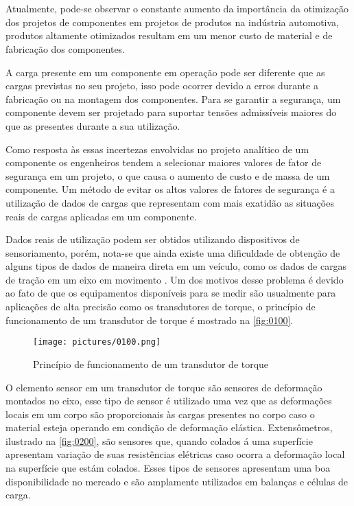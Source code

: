 

\chapter{}

Atualmente, pode-se observar o constante aumento da importância da otimização dos projetos de componentes em projetos de produtos na indústria automotiva, produtos altamente otimizados
resultam em um menor custo de material e de fabricação dos componentes.

A carga presente em um componente em operação pode ser diferente que as cargas previstas no seu projeto, isso pode ocorrer devido a erros durante a fabricação ou na montagem dos componentes.
Para se garantir a segurança, um componente devem ser projetado para suportar tensões admissíveis maiores do que as presentes durante a sua utilização. \autocite{Hibbeler2010}

Como resposta às essas incertezas envolvidas no projeto analítico de um componente os engenheiros tendem a selecionar maiores valores de fator de segurança em um projeto, o que causa o aumento
de custo e de massa de um componente.
Um método de evitar os altos valores de fatores de segurança é a utilização de dados de cargas que representam com mais exatidão as situações reais de cargas aplicadas em um componente.

Dados reais de utilização podem ser obtidos utilizando dispositivos de sensoriamento, porém, nota-se que ainda existe uma dificuldade de obtenção de alguns tipos de dados de maneira direta
em um veículo, como os dados de cargas de tração em um eixo em movimento \autocite{Nurprasetio2018}.
Um dos motivos desse problema é devido ao fato de que os equipamentos disponíveis para se medir são usualmente para aplicações de alta precisão como os transdutores de torque,
o princípio de funcionamento de um transdutor de torque é mostrado na \autoref{fig:0100}.

\begin{figure}[htb]
	\caption{\label{fig:0100} Princípio de funcionamento de um transdutor de torque}
	\begin{center}
		\texttt{[image: pictures/0100.png]}
	\end{center}
\end{figure}


O elemento sensor em um transdutor de torque são sensores de deformação montados no eixo, esse tipo de sensor é utilizado uma vez que as deformações locais em um corpo são proporcionais às
cargas presentes no corpo caso o material esteja operando em condição de deformação elástica.
Extensômetros, ilustrado na \autoref{fig:0200}, são sensores que, quando colados á uma superfície apresentam variação de suas resistências elétricas caso ocorra a deformação local na
superfície que estám colados.
Esses tipos de sensores apresentam uma boa disponibilidade no mercado e são amplamente utilizados em balanças e células de carga.

